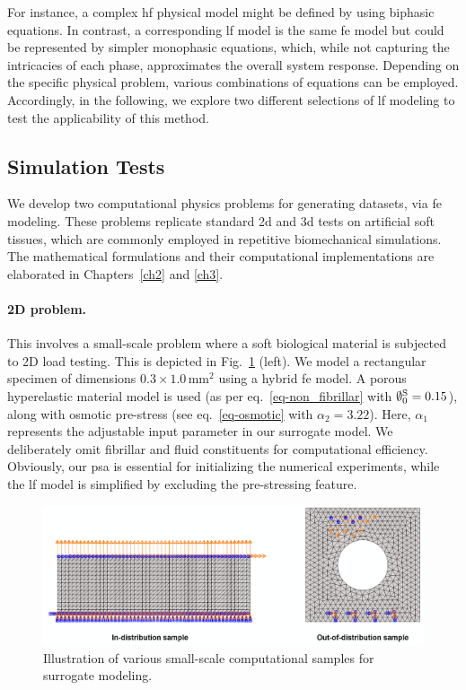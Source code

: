 \documentclass[12pt,a4paper]{report}
\begin{document}
For instance, a complex \ac{hf} physical model might be defined by using biphasic equations. In contrast, a corresponding \ac{lf} model is the same \ac{fe} model but could be represented by simpler monophasic equations, which, while not capturing the intricacies of each phase, approximates the overall system response. Depending on the specific physical problem, various combinations of equations can be employed. Accordingly, in the following, we explore two different selections of \ac{lf} modeling to test the applicability of this method.

\subsection{Simulation Tests}

We develop two computational physics problems for generating datasets, via \ac{fe} modeling. These problems replicate standard \ac{2d} and \ac{3d} tests on artificial soft tissues, which are commonly employed in repetitive biomechanical simulations. The mathematical formulations and their computational implementations are elaborated in Chapters~\ref{ch2} and \ref{ch3}.

\paragraph{2D problem.} This involves a small-scale problem where a soft biological material is subjected to 2D load testing. This is depicted in Fig.~\ref{fig:2d_model} (left). We model a rectangular specimen of dimensions $0.3 \times 1.0$\,mm$^2$ using a hybrid \ac{fe} model. A porous hyperelastic material model is used (as per eq.~\ref{eq-non_fibrillar} with $\emptyset_0^{\rm S}=0.15$), along with osmotic pre-stress (see eq.~\ref{eq-osmotic} with $\alpha_2 = 3.22$). Here, $\alpha_1$ represents the adjustable input parameter in our surrogate model. We deliberately omit fibrillar and fluid constituents for computational efficiency. Obviously, our \ac{psa} is essential for initializing the numerical experiments, while the \ac{lf} model is simplified by excluding the pre-stressing feature.
%
\begin{figure}\centering
\includegraphics[width=\linewidth]{2d_model.pdf}
\caption{Illustration of various small-scale computational samples for surrogate modeling.\label{fig:2d_model}}
\end{figure}
\end{document}
